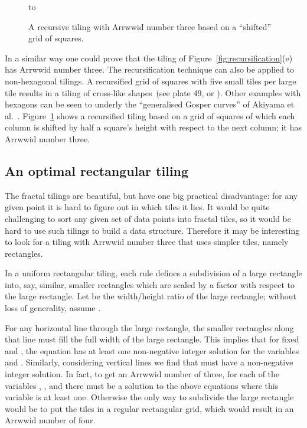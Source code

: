 \documentclass[11pt,a4paper]{article}
\begin{document}
\begin{figure}
\centering
\hbox to 
\caption{A recursive tiling with Arrwwid number three based on a ``shifted'' grid of squares.}
\label{fig:shiftedsquares}
\end{figure}

\enlargethispage{\baselineskip}
In a similar way one could prove that the tiling of Figure~\ref{fig:recursification}(e) has Arrwwid number three. The recursification technique can also be applied to non-hexagonal tilings. A recursified grid of squares with five small tiles per large tile results in a tiling of cross-like shapes~(see \cite{Mandelbrot1983} plate 49, or \cite{Teachout2009}). Other examples with hexagons can be seen to underly the ``generalised Gosper curves'' of Akiyama et al.~\cite{Akiyama2005}. Figure~\ref{fig:shiftedsquares} shows a recursified tiling based on a grid of squares of which each column is shifted by half a square's height with respect to the next column; it has Arrwwid number three.

\subsection{An optimal rectangular tiling}

The fractal tilings are beautiful, but have one big practical disadvantage: for any given point it is hard to figure out in which tiles it lies. It would be quite challenging to sort any given set of data points into fractal tiles, so it would be hard to use such tilings to build a data structure. Therefore it may be interesting to look for a tiling with Arrwwid number three that uses simpler tiles, namely rectangles.

In a uniform rectangular tiling, each rule defines a subdivision of a large rectangle into, say,  similar, smaller rectangles which are scaled by a factor  with respect to the large rectangle. Let  be the width/height ratio of the large rectangle; without loss of generality, assume .

For any horizontal line through the large rectangle, the smaller rectangles along that line must fill the full width of the large rectangle. This implies that for fixed  and ,  the equation
has at least one non-negative integer solution for the variables  and . Similarly, considering vertical lines we find that
must have a non-negative integer solution.
In fact, to get an Arrwwid number of three, for each of the variables , ,  and  there must be a solution to the above equations where this variable is at least one. Otherwise the only way to subdivide the large rectangle would be to put the tiles in a regular rectangular grid, which would result in an Arrwwid number of four.
\end{document}
